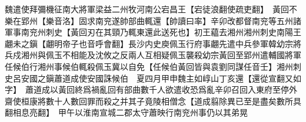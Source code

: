 魏遣使拜彌機征南大將軍梁益二州牧河南公宕昌王【宕徒浪翻使疏吏翻】　黃回不樂在郢州【樂音洛】固求南兖遂帥部曲輒還【帥讀曰率】辛卯改都督南兖等五州諸軍事南兖州刺史【黃回刃在其頸乃輒東還此送死也】初王藴去湘州湘州刺史南陽王翽未之鎭【翽明帝子也音呼會翻】長沙内史庾佩玉行府事翽先遣中兵參軍韓幼宗將兵戍湘州與佩玉不相能及沈攸之反兩人互相疑佩玉襲殺幼宗黃回至郢州遣輔國將軍任候伯行湘州事候伯輒殺佩玉冀以自免【任候伯黃回皆與袁劉同謀任音壬】湘州刺史呂安國之鎭蕭道成使安國誅候伯　夏四月甲申魏主如崞山丁亥還【還從宣翻又如字】　蕭道成以黃回終爲禍亂回有部曲數千人欲遣收恐爲亂辛卯召回入東府至停外齋使桓康將數十人數回罪而殺之并其子竟陵相僧念【道成翦除異已至是盡矣數所具翻相息亮翻】　甲午以淮南宣城二郡太守蕭映行南兖州事仍以其弟晃